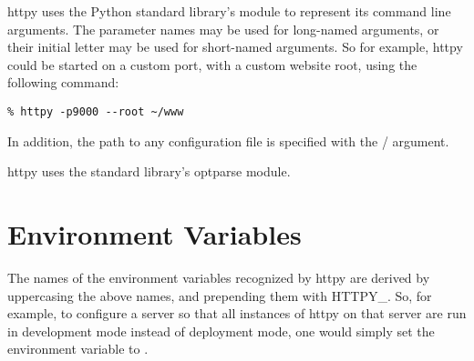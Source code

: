 httpy uses the Python standard library's  module to represent
its command line arguments. The parameter names may be used for long-named
arguments, or their initial letter may be used for short-named arguments. So for
example, httpy could be started on a custom port, with a custom website root,
using the following command:

\begin{verbatim}
% httpy -p9000 --root ~/www
\end{verbatim}

In addition, the path to any configuration file is specified with the
/ argument.

\begin{seealso}
          {httpy uses the standard library's optparse module.}
\end{seealso}


\section{Environment Variables}

The names of the environment variables recognized by httpy are derived by
uppercasing the above names, and prepending them with HTTPY_. So, for example,
to configure a server so that all instances of httpy on that server are run in
development mode instead of deployment mode, one would simply set the
environment variable  to .
